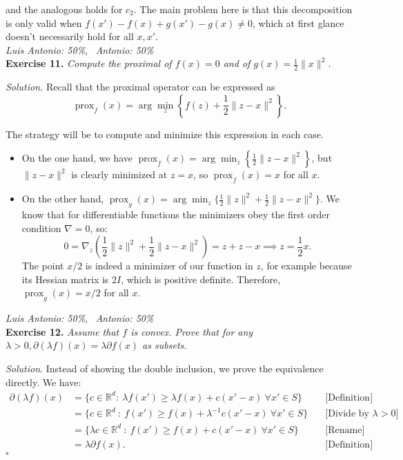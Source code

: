 \documentclass[12pt]{article}
\newcommand*{\QED}{\null\nobreak\hfill\ensuremath{\square}}%
\begin{document}
and the analogous holds for $c_2$. The main problem here is that this decomposition is only valid when $f(x') - f(x) + g(x') - g(x) \neq 0$, which at first glance doesn't necessarily hold for all $x,x'$.\\

\textit{Luis Antonio: 50\%}, \ \textit{Antonio: 50\%}\\
\textbf{Exercise 11. }\emph{Compute the proximal of \( f(x) = 0 \) and of \( g(x) = \frac{1}{2}\|x\|^2 \).}

\emph{Solution.} Recall that the proximal operator can be expressed as
\[ \operatorname{prox}_f(x) = \arg\min_z\left\{f(z) + \frac{1}{2} \|z - x\|^2 \right\}. \]

The strategy will be to compute and minimize this expression in each case.
\begin{itemize}
    \item On the one hand, we have \( \operatorname{prox}_f(x) = \arg\min_z\left\{ \frac{1}{2} \|z - x\|^2 \right\} \), but \( \|z-x\|^2 \) is clearly minimized at \( z = x \), so $\operatorname{prox}_f(x)=x$ for all $x$.
    \item  On the other hand, \( \operatorname{prox}_g(x) = \arg\min_z\{\frac{1}{2}\|z\|^2 + \frac{1}{2} \|z - x\|^2 \}\). We know that for differentiable functions the minimizers obey the first order condition $\nabla =0$, so:
    \[
         0=\nabla_z \left(\frac{1}{2} \|z\|^2 + \frac{1}{2}\|z-x\|^2\right) = z + z - x\implies z = \frac{1}{2}x.
    \]
    The point $x/2$ is indeed a minimizer of our function in $z$, for example because its Hessian matrix is $2I$, which is positive definite. Therefore, \( \operatorname{prox}_g(x) = x/2 \) for all $x$.\\
\end{itemize}

\textit{Luis Antonio: 50\%}, \ \textit{Antonio: 50\%}\\
\textbf{Exercise 12. }\emph{Assume that \( f \)  is convex. Prove that for any \( \lambda > 0, \partial(\lambda f)(x) = \lambda \partial f(x) \) as subsets.}

\emph{Solution}. Instead of showing the double inclusion, we prove the equivalence directly. We have:
\[
    \begin{align*}
     \partial(\lambda f)(x) &= \{c \in \mathbb{R}^d: \ \lambda f(x') \geq \lambda f(x) + c(x' - x)\ \forall x' \in S\} \quad &\text{[Definition]}\\
     &= \{c \in \mathbb{R}^d \ : \  f(x') \geq f(x) + \lambda^{-1} c(x' - x)\ \forall x' \in S\}\quad &\text{[Divide by $\lambda>0$]} \\
     &= \{\lambda c \in \mathbb{R}^d \ : \  f(x') \geq f(x) + c(x' - x)\ \forall x' \in S\}\quad &\text{[Rename]} \\
     &= \lambda \partial f(x).\quad &\text{[Definition]}
   \end{align*}
\]
\QED
\end{document}
